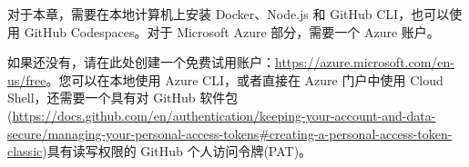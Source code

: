 对于本章，需要在本地计算机上安装 Docker、Node.js 和 GitHub CLI，也可以使用 GitHub Codespaces。对于 Microsoft Azure 部分，需要一个 Azure 账户。

如果还没有，请在此处创建一个免费试用账户：\url{https://azure.microsoft.com/en-us/free}。您可以在本地使用 Azure CLI，或者直接在 Azure 门户中使用 Cloud Shell，还需要一个具有对 GitHub 软件包(\url{https://docs.github.com/en/authentication/keeping-your-account-and-data-secure/managing-your-personal-access-tokens#creating-a-personal-access-token-classic})具有读写权限的 GitHub 个人访问令牌(PAT)。